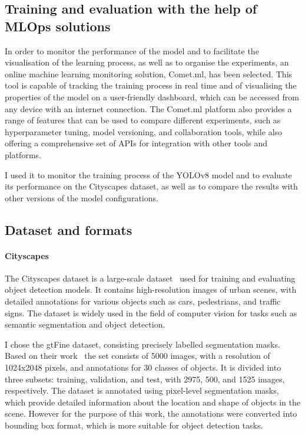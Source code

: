 \subsection{Training and evaluation with the help of MLOps solutions}\label{subsec:training-and-evaluation-with-the-help-of-mlops-solutions}
In order to monitor the performance of the model and to facilitate the visualisation of the learning process,
as well as to organise the experiments, an online machine learning monitoring solution, Comet.ml, has been selected.
This tool is capable of tracking the training process in real time and of visualising the properties of the model on
a user-friendly dashboard, which can be accessed from any device with an internet connection.
The Comet.ml platform also provides a range of features that can be used to compare different experiments,
such as hyperparameter tuning, model versioning, and collaboration tools, while also offering a comprehensive
set of APIs for integration with other tools and platforms.

I used it to monitor the training process of the YOLOv8 model and to evaluate its performance on the Cityscapes dataset,
as well as to compare the results with other versions of the model configurations.


\subsection{Dataset and formats}\label{subsec:dataset-and-formats}

\paragraph{Cityscapes}\label{par:cityscapes}
The Cityscapes dataset is a large-scale dataset~\cite{Cordts2016Cityscapes} used for training and evaluating object detection models.
It contains high-resolution images of urban scenes, with detailed annotations for various objects such as cars,
pedestrians, and traffic signs.
The dataset is widely used in the field of computer vision for tasks such as semantic segmentation and object detection.

I chose the gtFine dataset, consisting precisely labelled segmentation masks.
Based on their work~\cite{Cordts2016Cityscapes} the set consists of 5000 images, with a resolution of 1024x2048 pixels, and annotations for 30 classes of objects.
It is divided into three subsets: training, validation, and test, with 2975, 500, and 1525 images, respectively.
The dataset is annotated using pixel-level segmentation masks, which provide detailed information about the
location and shape of objects in the scene.
However for the purpose of this work, the annotations were converted into bounding box format,
which is more suitable for object detection tasks.


